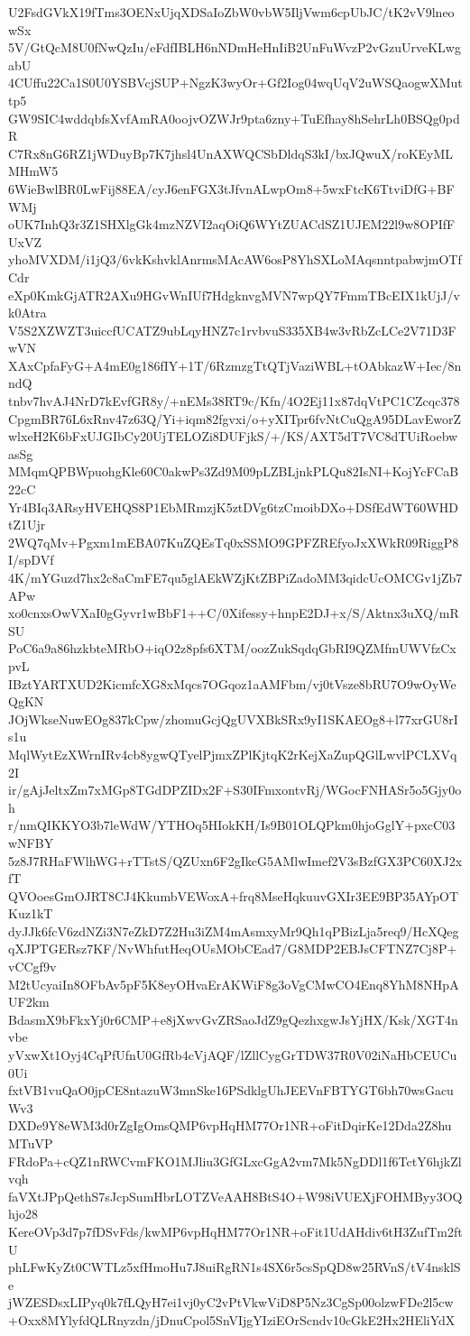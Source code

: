 U2FsdGVkX19fTms3OENxUjqXDSaIoZbW0vbW5IljVwm6cpUbJC/tK2vV9lneowSx
5V/GtQcM8U0fNwQzIu/eFdfIBLH6nNDmHeHnIiB2UnFuWvzP2vGzuUrveKLwgabU
4CUffu22Ca1S0U0YSBVcjSUP+NgzK3wyOr+Gf2Iog04wqUqV2uWSQaogwXMuttp5
GW9SIC4wddqbfsXvfAmRA0oojvOZWJr9pta6zny+TuEfhay8hSehrLh0BSQg0pdR
C7Rx8nG6RZ1jWDuyBp7K7jhsl4UnAXWQCSbDldqS3kI/bxJQwuX/roKEyMLMHmW5
6WieBwlBR0LwFij88EA/cyJ6enFGX3tJfvnALwpOm8+5wxFtcK6TtviDfG+BFWMj
oUK7InhQ3r3Z1SHXlgGk4mzNZVI2aqOiQ6WYtZUACdSZ1UJEM22l9w8OPIfFUxVZ
yhoMVXDM/i1jQ3/6vkKshvklAnrmsMAcAW6osP8YhSXLoMAqsnntpabwjmOTfCdr
eXp0KmkGjATR2AXu9HGvWnIUf7HdgknvgMVN7wpQY7FmmTBcEIX1kUjJ/vk0Atra
V5S2XZWZT3uiccfUCATZ9ubLqyHNZ7c1rvbvuS335XB4w3vRbZcLCe2V71D3FwVN
XAxCpfaFyG+A4mE0g186fIY+1T/6RzmzgTtQTjVaziWBL+tOAbkazW+Iec/8nndQ
tnbv7hvAJ4NrD7kEvfGR8y/+nEMs38RT9c/Kfn/4O2Ej11x87dqVtPC1CZcqc378
CpgmBR76L6xRnv47z63Q/Yi+iqm82fgvxi/o+yXITpr6fvNtCuQgA95DLavEworZ
wlxeH2K6bFxUJGIbCy20UjTELOZi8DUFjkS/+/KS/AXT5dT7VC8dTUiRoebwasSg
MMqmQPBWpuohgKle60C0akwPs3Zd9M09pLZBLjnkPLQu82IsNI+KojYcFCaB22cC
Yr4BIq3ARsyHVEHQS8P1EbMRmzjK5ztDVg6tzCmoibDXo+DSfEdWT60WHDtZ1Ujr
2WQ7qMv+Pgxm1mEBA07KuZQEsTq0xSSMO9GPFZREfyoJxXWkR09RiggP8I/spDVf
4K/mYGuzd7hx2c8aCmFE7qu5glAEkWZjKtZBPiZadoMM3qidcUcOMCGv1jZb7APw
xo0cnxsOwVXaI0gGyvr1wBbF1++C/0Xifessy+hnpE2DJ+x/S/Aktnx3uXQ/mRSU
PoC6a9a86hzkbteMRbO+iqO2z8pfs6XTM/oozZukSqdqGbRI9QZMfmUWVfzCxpvL
IBztYARTXUD2KicmfcXG8xMqcs7OGqoz1aAMFbm/vj0tVsze8bRU7O9wOyWeQgKN
JOjWkseNuwEOg837kCpw/zhomuGcjQgUVXBkSRx9yI1SKAEOg8+l77xrGU8rIs1u
MqlWytEzXWrnIRv4cb8ygwQTyelPjmxZPlKjtqK2rKejXaZupQGlLwvlPCLXVq2I
ir/gAjJeltxZm7xMGp8TGdDPZIDx2F+S30IFmxontvRj/WGocFNHASr5o5Gjy0oh
r/nmQIKKYO3b7leWdW/YTHOq5HIokKH/Is9B01OLQPkm0hjoGglY+pxcC03wNFBY
5z8J7RHaFWlhWG+rTTstS/QZUxn6F2gIkcG5AMlwImef2V3sBzfGX3PC60XJ2xfT
QVOoesGmOJRT8CJ4KkumbVEWoxA+frq8MseHqkuuvGXIr3EE9BP35AYpOTKuz1kT
dyJJk6fcV6zdNZi3N7eZkD7Z2Hu3iZM4mAsmxyMr9Qh1qPBizLja5req9/HcXQeg
qXJPTGERsz7KF/NvWhfutHeqOUsMObCEad7/G8MDP2EBJsCFTNZ7Cj8P+vCCgf9v
M2tUcyaiIn8OFbAv5pF5K8eyOHvaErAKWiF8g3oVgCMwCO4Enq8YhM8NHpAUF2km
BdasmX9bFkxYj0r6CMP+e8jXwvGvZRSaoJdZ9gQezhxgwJsYjHX/Ksk/XGT4nvbe
yVxwXt1Oyj4CqPfUfnU0GfRb4cVjAQF/lZllCygGrTDW37R0V02iNaHbCEUCu0Ui
fxtVB1vuQaO0jpCE8ntazuW3mnSke16PSdklgUhJEEVnFBTYGT6bh70wsGacuWv3
DXDe9Y8eWM3d0rZgIgOmsQMP6vpHqHM77Or1NR+oFitDqirKe12Dda2Z8huMTuVP
FRdoPa+cQZ1nRWCvmFKO1MJliu3GfGLxcGgA2vm7Mk5NgDDl1f6TctY6hjkZlvqh
faVXtJPpQethS7sJcpSumHbrLOTZVeAAH8BtS4O+W98iVUEXjFOHMByy3OQhjo28
KereOVp3d7p7fDSvFds/kwMP6vpHqHM77Or1NR+oFit1UdAHdiv6tH3ZufTm2ftU
phLFwKyZt0CWTLz5xfHmoHu7J8uiRgRN1s4SX6r5csSpQD8w25RVnS/tV4nsklSe
jWZESDsxLIPyq0k7fLQyH7ei1vj0yC2vPtVkwViD8P5Nz3CgSp00olzwFDe2l5cw
+Oxx8MYlyfdQLRnyzdn/jDnuCpol5SnVIjgYIziEOrScndv10cGkE2Hx2HEliYdX

